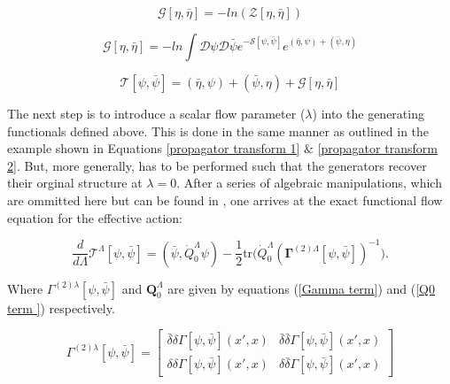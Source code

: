 \documentclass[12pt]{article}
\begin{document}
\begin{equation} \label{Greens function functional}
    \mathcal{G}[\eta, \bar{\eta}] = -ln(\mathcal{Z}[\eta, \bar{\eta}])
\end{equation}

\begin{equation}\label{G term in effective action}
    \mathcal{G}[\eta, \bar{\eta}] = 
    -ln \int{\mathcal{D}\psi \mathcal{D} \bar{\psi}e^{-\mathcal{S}[\psi, \bar{\psi}]}e^{(\bar{\eta}, \psi) +(\bar{\psi}, \eta)}}
\end{equation}

\begin{equation} \label{Effective action}
    \mathcal{T}[\psi, \bar{\psi}] = (\bar{\eta},\psi) + (\bar{\psi},\eta) + \mathcal{G}[\eta, \bar{\eta}]
\end{equation}


\noindent The next step is to introduce a scalar flow parameter ($\lambda$) into the generating functionals defined above. This is done in the same manner as outlined in the example shown in Equations \ref{propagator transform 1} $\&$ \ref{propagator transform 2}. 
But, more generally, has to be performed such that the generators recover their orginal structure at $\lambda = 0 $.
After a series of algebraic manipulations, which are ommitted here but can be found in \cite{metzner2012functional}, one arrives at the exact functional flow equation for the effective action:


\begin{equation} \label{eq:ExactFunctionalFlowEquation}
    \frac{d}{d\Lambda} \mathcal{T}^{\Lambda}[\psi, \bar{\psi}] = (\bar{\psi}, \dot{Q}_0^{\Lambda} \psi) - \frac{1}{2} \text{tr} \big( \dot{Q}_0^{\Lambda} (\boldsymbol{\Gamma}^{(2)\Lambda}[\psi, \bar{\psi}])^{-1} \big).
\end{equation}

\noindent Where $\Gamma^{(2)\lambda}[\psi, \bar{\psi}]$ and  $\textbf{Q}_0^{\Lambda}$ are given by equations (\ref{Gamma term}) and (\ref{Q0 term }) respectively.



\begin{equation}\label{Gamma term}
\Gamma^{(2)\lambda}[\psi, \bar{\psi}] = 
\begin{bmatrix}
\bar{\delta} \delta \Gamma[\psi, \bar{\psi}](x',x) & \bar{\delta} \bar{\delta} \Gamma[\psi, \bar{\psi}](x',x) \\
\delta \delta \Gamma[\psi, \bar{\psi}](x',x)  & \delta \bar{\delta} \Gamma[\psi, \bar{\psi}](x',x)
\end{bmatrix}
\end{equation}
\end{document}
